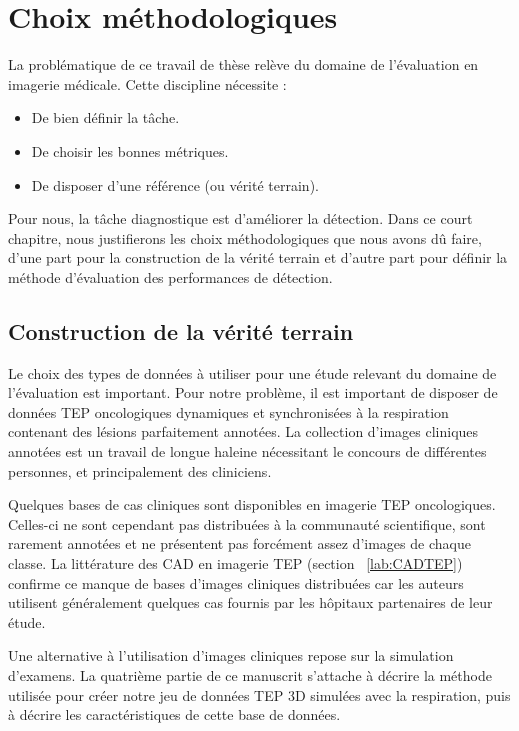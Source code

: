 \chapter{Choix méthodologiques}


La problématique de ce travail de thèse relève du domaine de l'évaluation en imagerie médicale. Cette discipline nécessite :

\begin{itemize}
 \item De bien définir la tâche.
 \item De choisir les bonnes métriques.
 \item De disposer d'une référence (ou vérité terrain).
\end{itemize}

Pour nous, la tâche diagnostique est d'améliorer la détection. Dans ce court chapitre, nous justifierons les choix méthodologiques que nous avons dû faire, d'une part pour la construction de la vérité terrain et d'autre part pour définir la méthode d'évaluation des performances de détection.

\section{Construction de la vérité terrain}

Le choix des types de données à utiliser pour une étude relevant du domaine de l'évaluation est important. Pour notre problème, il est important de disposer de données TEP oncologiques dynamiques et synchronisées à la respiration contenant des lésions parfaitement annotées. La collection d’images cliniques annotées est un travail de longue haleine nécessitant le concours de différentes personnes, et principalement des cliniciens. 


Quelques bases de cas cliniques sont disponibles en imagerie TEP oncologiques. Celles-ci ne sont cependant pas distribuées à la communauté scientifique, sont rarement annotées et ne présentent pas forcément assez d’images de chaque classe. La littérature des CAD en imagerie TEP (section ~\ref{lab:CADTEP}) confirme ce manque de bases d’images cliniques distribuées car les auteurs utilisent généralement quelques cas fournis par les hôpitaux partenaires de leur étude. 

Une alternative à l’utilisation d’images cliniques repose sur la simulation d’examens. La quatrième partie de ce manuscrit s'attache à décrire la méthode utilisée pour créer notre jeu de données TEP 3D simulées avec la respiration, puis à décrire les caractéristiques de cette base de données.

